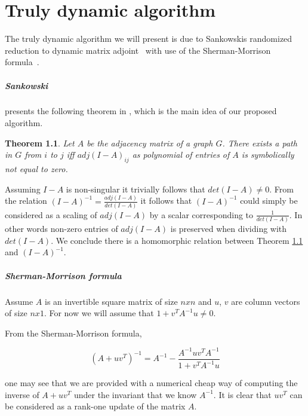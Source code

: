 \documentclass[a4paper,oneside,article,11pt]{memoir}
\newtheorem{thrm}{Theorem}
\begin{document}
\chapter{Truly dynamic algorithm}
\label{chap:sankowski}

The truly dynamic algorithm we will present is due to Sankowskis randomized reduction to dynamic matrix adjoint~\cite{Reif1997347} with use of the Sherman-Morrison formula~\cite{lecnotes}.

\paragraph{Sankowski} presents the following theorem in \cite{Reif1997347}, which is the main idea of our proposed algorithm.

\begin{thrm}

\label{thrm:sankowski-path}
Let $A$ be the adjacency matrix of a graph $G$. There exists a path in $G$ from $i$ to $j$ \textit{iff} $adj(I-A)_{ij}$ as polynomial of entries of $A$ is symbolically not equal to zero.
\end{thrm}

Assuming $I-A$ is non-singular it trivially follows that $det(I-A) \not = 0$. From the relation $(I-A)^{-1} = \frac{adj(I-A)}{det(I-A)}$ it follows that $(I-A)^{-1}$ could simply be considered as a scaling of $adj(I-A)$ by a scalar corresponding to $\frac{1}{det(I-A)}$. In other words non-zero entries of $adj(I-A)$ is preserved when dividing with $det(I-A)$. We conclude there is a homomorphic relation between Theorem \ref{thrm:sankowski-path} and $(I-A)^{-1}$. %

\paragraph{Sherman-Morrison formula}

Assume $A$ is an invertible square matrix of size $nxn$ and $u$, $v$ are column vectors of size $nx1$. For now we will assume that $1 + v^T A^{-1} u \not = 0$.

From the Sherman-Morrison formula,

\begin{equation} \label{eq:ShermanMorrison}
(A+uv^T)^{-1} = A^{-1} - \dfrac{A^{-1}uv^TA^{-1}}{1 + v^T A^{-1} u}
\end{equation}

one may see that we are provided with a numerical cheap way of computing the inverse of $A + uv^T$ under the invariant that we know $A^{-1}$. It is clear that $uv^T$ can be considered as a rank-one update of the matrix $A$.
\end{document}

